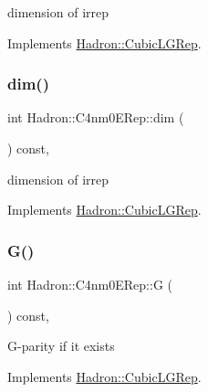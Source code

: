 dimension of irrep 

Implements \mbox{\hyperlink{structHadron_1_1CubicLGRep_a3acbaea26503ed64f20df693a48e4cdd}{Hadron\+::\+Cubic\+L\+G\+Rep}}.

\mbox{\label{structHadron_1_1C4nm0ERep_ad264e17a212eb7e2cf71ba25f16caa06}} 
\subsubsection{\texorpdfstring{dim()}{dim()}\hspace{0.1cm}{\footnotesize\ttfamily [3/3]}}
{\footnotesize\ttfamily int Hadron\+::\+C4nm0\+E\+Rep\+::dim (\begin{DoxyParamCaption}{ }\end{DoxyParamCaption}) const\hspace{0.3cm}{\ttfamily [inline]}, {\ttfamily [virtual]}}

dimension of irrep 

Implements \mbox{\hyperlink{structHadron_1_1CubicLGRep_a3acbaea26503ed64f20df693a48e4cdd}{Hadron\+::\+Cubic\+L\+G\+Rep}}.

\mbox{\label{structHadron_1_1C4nm0ERep_aeed131ece7b7c5203a64ac3591c75f59}} 
\subsubsection{\texorpdfstring{G()}{G()}\hspace{0.1cm}{\footnotesize\ttfamily [1/3]}}
{\footnotesize\ttfamily int Hadron\+::\+C4nm0\+E\+Rep\+::G (\begin{DoxyParamCaption}{ }\end{DoxyParamCaption}) const\hspace{0.3cm}{\ttfamily [inline]}, {\ttfamily [virtual]}}

G-\/parity if it exists 

Implements \mbox{\hyperlink{structHadron_1_1CubicLGRep_ace26f7b2d55e3a668a14cb9026da5231}{Hadron\+::\+Cubic\+L\+G\+Rep}}.

\mbox{\label{structHadron_1_1C4nm0ERep_aeed131ece7b7c5203a64ac3591c75f59}} 
